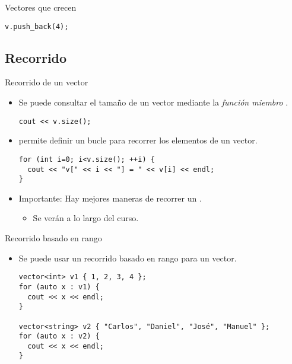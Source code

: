 \begin{frame}[fragile]{Vectores que crecen}
\begin{lstlisting}
v.push_back(4);
\end{lstlisting}
\end{frame}

\subsection{Recorrido}

\begin{frame}[fragile]{Recorrido de un vector}
\begin{itemize}
\item Se puede consultar el tamaño de un vector mediante la \emph{función miembro} .
\begin{lstlisting}
cout << v.size();
\end{lstlisting}
\item {} permite definir un bucle para recorrer los elementos de un vector.
\begin{lstlisting}
for (int i=0; i<v.size(); ++i) {
  cout << "v[" << i << "] = " << v[i] << endl;
}
\end{lstlisting}
  \item \alert{Importante}: Hay mejores maneras de recorrer un .
    \begin{itemize}
      \item Se verán a lo largo del curso.
    \end{itemize}
\end{itemize}
\end{frame}

\begin{frame}[t,fragile]{Recorrido basado en rango}
\begin{itemize}
  \item Se puede usar un recorrido basado en rango para un vector.
\begin{lstlisting}
vector<int> v1 { 1, 2, 3, 4 };
for (auto x : v1) {
  cout << x << endl;
}

vector<string> v2 { "Carlos", "Daniel", "José", "Manuel" };
for (auto x : v2) {
  cout << x << endl;
}
\end{lstlisting}
\end{itemize}
\end{frame}

